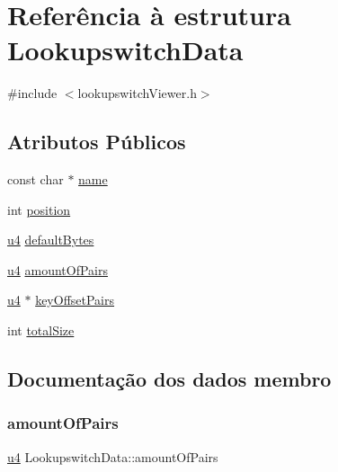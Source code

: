 \hypertarget{struct_lookupswitch_data}{}\section{Referência à estrutura Lookupswitch\+Data}
\label{struct_lookupswitch_data}


{\ttfamily \#include $<$lookupswitch\+Viewer.\+h$>$}

\subsection*{Atributos Públicos}
\begin{DoxyCompactItemize}
\item 
const char $\ast$ \hyperlink{struct_lookupswitch_data_aa7422f01abbe6a3c7274eb3814070ff2}{name}
\item 
int \hyperlink{struct_lookupswitch_data_a5d0ee67c83b73f23e3f545bbd98b1aa6}{position}
\item 
\hyperlink{util_8h_ae391a1d79bb0c8cbc283f0283e3c098b}{u4} \hyperlink{struct_lookupswitch_data_adbb8fa143be5171bda1b50a4f6865c69}{default\+Bytes}
\item 
\hyperlink{util_8h_ae391a1d79bb0c8cbc283f0283e3c098b}{u4} \hyperlink{struct_lookupswitch_data_a3d9bc7796fec1e4e225cd67e4e4edf52}{amount\+Of\+Pairs}
\item 
\hyperlink{util_8h_ae391a1d79bb0c8cbc283f0283e3c098b}{u4} $\ast$ \hyperlink{struct_lookupswitch_data_abeb3d24ab5d002219d5591717e015f75}{key\+Offset\+Pairs}
\item 
int \hyperlink{struct_lookupswitch_data_ac65eda1cf7fd0950f65f468dc78b4133}{total\+Size}
\end{DoxyCompactItemize}


\subsection{Documentação dos dados membro}
\mbox{\label{struct_lookupswitch_data_a3d9bc7796fec1e4e225cd67e4e4edf52}} 
\subsubsection{\texorpdfstring{amount\+Of\+Pairs}{amountOfPairs}}
{\footnotesize\ttfamily \hyperlink{util_8h_ae391a1d79bb0c8cbc283f0283e3c098b}{u4} Lookupswitch\+Data\+::amount\+Of\+Pairs}

